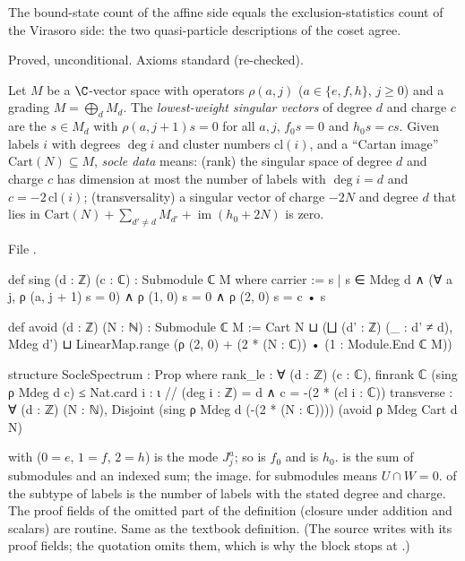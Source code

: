 \begin{physics}
The bound-state count of the affine side equals the exclusion-statistics count of the Virasoro side: the two
quasi-particle descriptions of the coset agree.
\end{physics}

\begin{status}
Proved, unconditional. Axioms standard (re-checked).
\end{status}

\begin{definition}\label{l29:def:soclespectrum}
Let $M$ be a $\C$-vector space with operators $\rho(a,j)$ ($a\in\{e,f,h\}$, $j\ge0$) and a grading $M=\bigoplus_dM_d$.
The \emph{lowest-weight singular vectors} of degree $d$ and charge $c$ are the $s\in M_d$ with $\rho(a,j+1)s=0$ for all
$a,j$, $f_0s=0$ and $h_0s=cs$. Given labels $i$ with degrees $\deg i$ and cluster numbers $\mathrm{cl}(i)$, and a
``Cartan image'' $\mathrm{Cart}(N)\subseteq M$, \emph{socle data} means: (rank) the singular space of degree $d$ and
charge $c$ has dimension at most the number of labels with $\deg i=d$ and $c=-2\,\mathrm{cl}(i)$; (transversality) a
singular vector of charge $-2N$ and degree $d$ that lies in $\mathrm{Cart}(N)+\sum_{d'\ne d}M_{d'}+\operatorname{im}(h_0+2N)$
is zero.
\end{definition}

\noindent File .
\begin{leancode}
def sing (d : ℤ) (c : ℂ) : Submodule ℂ M where
  carrier := {s | s ∈ Mdeg d ∧ (∀ a j, ρ (a, j + 1) s = 0) ∧ ρ (1, 0) s = 0 ∧
    ρ (2, 0) s = c • s}

def avoid (d : ℤ) (N : ℕ) : Submodule ℂ M :=
  Cart N ⊔ (⨆ (d' : ℤ) (_ : d' ≠ d), Mdeg d') ⊔
    LinearMap.range (ρ (2, 0) + (2 * (N : ℂ)) • (1 : Module.End ℂ M))

structure SocleSpectrum : Prop where
  rank_le : ∀ (d : ℤ) (c : ℂ), finrank ℂ (sing ρ Mdeg d c) ≤
    Nat.card {i : ι // (deg i : ℤ) = d ∧ c = -(2 * (cl i : ℂ))}
  transverse : ∀ (d : ℤ) (N : ℕ),
    Disjoint (sing ρ Mdeg d (-(2 * (N : ℂ)))) (avoid ρ Mdeg Cart d N)
\end{leancode}

\begin{dictionary}
 with  ($0=e$, $1=f$, $2=h$) is the mode $J^a_j$; so  is $f_0$ and
 is $h_0$.  is the sum of submodules and  an indexed sum;  the
image.  for submodules means $U\cap W=0$.  of the subtype of labels is the number of
labels with the stated degree and charge. The proof fields of the omitted part of the definition (closure under
addition and scalars) are routine. Same as the textbook definition. (The source writes  with its proof
fields; the quotation omits them, which is why the block stops at .)
\end{dictionary}

